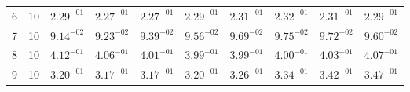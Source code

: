 \begin{table}
\begin{tabular}{c c c c c c c c c c}
   6 &   10 & $ 2.29^{-01}$ & $ 2.27^{-01}$ & $ 2.27^{-01}$ & $ 2.29^{-01}$ & $ 2.31^{-01}$ & $ 2.32^{-01}$ & $ 2.31^{-01}$ & $ 2.29^{-01}$ \\%
   7  &   10 & $ 9.14^{-02}$ & $ 9.23^{-02}$ & $ 9.39^{-02}$ & $ 9.56^{-02}$ & $ 9.69^{-02}$ & $ 9.75^{-02}$ & $ 9.72^{-02}$ & $ 9.60^{-02}$ \\%
   8 &   10 & $ 4.12^{-01}$ & $ 4.06^{-01}$ & $ 4.01^{-01}$ & $ 3.99^{-01}$ & $ 3.99^{-01}$ & $ 4.00^{-01}$ & $ 4.03^{-01}$ & $ 4.07^{-01}$ \\%
   9 &   10 & $ 3.20^{-01}$ & $ 3.17^{-01}$ & $ 3.17^{-01}$ & $ 3.20^{-01}$ & $ 3.26^{-01}$ & $ 3.34^{-01}$ & $ 3.42^{-01}$ & $ 3.47^{-01}$ \\%

\end{tabular}
\end{table}
